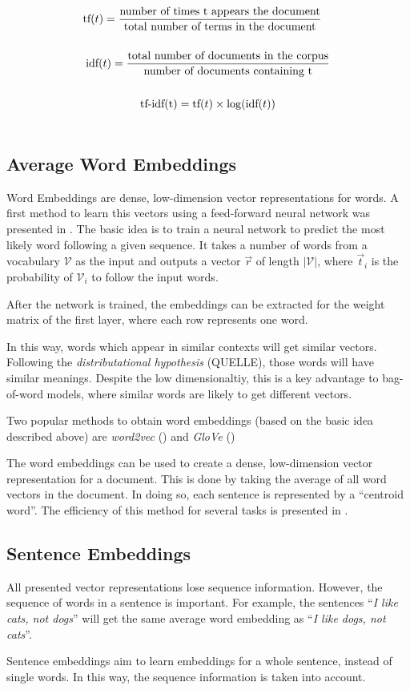 \begin{equation*}
\begin{multlined}
\text{tf}(t) = \frac{\text{number of times t appears the document}}{\text{total number of terms in the document}} \\
\hfill\\
\text{idf}(t) = \frac{\text{total number of documents in the corpus}}{\text{number of documents containing t}} \\
\hfill\\
\text{tf-idf(t)} = \text{tf}(t) \times \log (\text{idf}(t)) \\
\end{multlined}
\end{equation*}



\subsection{Average Word Embeddings}
Word Embeddings are dense, low-dimension vector representations for words. A first method to learn this vectors using a feed-forward neural network was presented in \cite{bengio2003neural}. The basic idea is to train a neural network to predict the most likely word following a given sequence. It takes a number of words from a vocabulary $\mathcal{V}$ as the input and outputs a vector $\vec{r}$ of length $|\mathcal{V}|$, where $\vec{t}_i$ is the probability of $\mathcal{V}_i$ to follow the input words.

After the network is trained, the embeddings can be extracted for the weight matrix of the first layer, where each row represents one word.

In this way, words which appear in similar contexts will get similar vectors. Following the \emph{distributational hypothesis} (QUELLE), those words will have similar meanings. Despite the low dimensionaltiy, this is a key advantage to bag-of-word models, where similar words are likely to get different vectors.

Two popular methods to obtain word embeddings (based on the basic idea described above) are \emph{word2vec} (\cite{NIPS2013_5021}) and \emph{GloVe} (\cite{pennington2014glove})

The word embeddings can be used to create a dense, low-dimension vector representation for a document. This is done by taking the average of all word vectors in the document. In doing so, each sentence is represented by a \enquote{centroid word}. The efficiency of this method for several tasks is presented in \cite{Wieting:2015aa}.

\subsection{Sentence Embeddings}
All presented vector representations lose sequence information. However, the sequence of words in a sentence is important. For example, the sentences \enquote{\emph{I like cats, not dogs}} will get the same average word embedding as \enquote{\emph{I like dogs, not cats}}.

Sentence embeddings aim to learn embeddings for a whole sentence, instead of single words. In this way, the sequence information is taken into account.